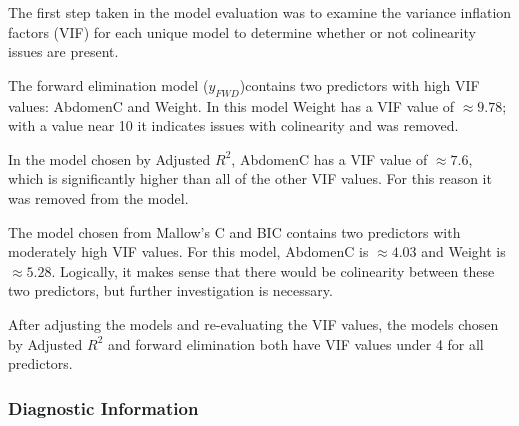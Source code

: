 \documentclass[a4paper, 11pt]{article}
\begin{document}
The first step taken in the model evaluation was to examine the variance inflation factors (VIF) for each unique model to determine whether or not colinearity issues are present.

The forward elimination model ($y_{FWD}$)contains two predictors with high VIF values: AbdomenC and Weight. In this model Weight has a VIF value of $\approx 9.78$; with a value near 10 it indicates issues with colinearity and was removed.

In the model chosen by Adjusted $R^2$, AbdomenC has a VIF value of $\approx 7.6$, which is significantly higher than all of the other VIF values. For this reason it was removed from the model.

The model chosen from Mallow's C and BIC contains two predictors with moderately high VIF values. For this model, AbdomenC is $\approx 4.03$ and Weight is $\approx 5.28$. Logically, it makes sense that there would be colinearity between these two predictors, but further investigation is necessary. 

After adjusting the models and re-evaluating the VIF values, the models chosen by Adjusted $R^2$ and forward elimination both have VIF values under 4 for all predictors.

\subsubsection*{Diagnostic Information}
%
%		
%		
%		
%		
\end{document}
